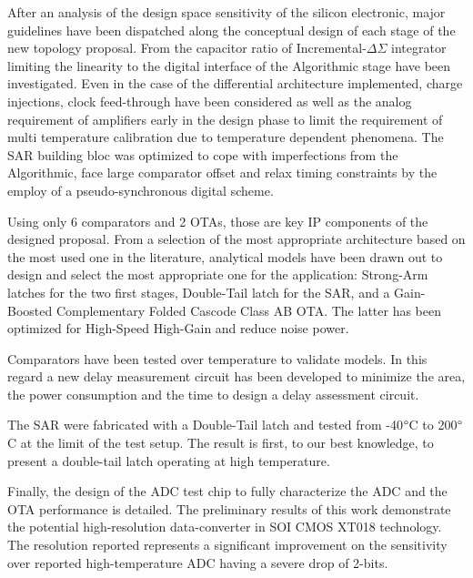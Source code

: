 After an analysis of the design space sensitivity of the silicon electronic, major guidelines have been dispatched along the conceptual design of each stage of the new topology proposal. From the capacitor ratio of Incremental-\(\Delta \Sigma\) integrator limiting the linearity to the digital interface of the Algorithmic stage have been investigated. Even in the case of the differential architecture implemented, charge injections, clock feed-through have been considered as well as the analog requirement of amplifiers early in the design phase to limit the requirement of multi temperature calibration due to temperature dependent phenomena. The SAR building bloc was optimized to cope with imperfections from the Algorithmic, face large comparator offset and relax timing constraints by the employ of a pseudo-synchronous digital scheme.

Using only 6 comparators and 2 OTAs, those are key IP components of the designed proposal. From a selection of the most appropriate architecture based on the most used one in the literature, analytical models have been drawn out to design and select the most appropriate one for the application: Strong-Arm latches for the two first stages, Double-Tail latch for the SAR, and a Gain-Boosted Complementary Folded Cascode Class AB OTA\@. The latter has been optimized for High-Speed High-Gain and reduce noise power.

Comparators have been tested over temperature to validate models. In this regard a new delay measurement circuit has been developed to minimize the area, the power consumption and the time to design a delay assessment circuit.

The SAR were fabricated with a Double-Tail latch and tested from -40$\degree$C to 200$\degree$C at the limit of the test setup. The result is first, to our best knowledge, to present a double-tail latch operating at high temperature.

Finally, the design of the ADC test chip to fully characterize the ADC and the OTA performance is detailed. The preliminary results of this work demonstrate the potential high-resolution data-converter in SOI CMOS XT018 technology. The resolution reported represents a significant improvement on the sensitivity over reported high-temperature ADC having a severe drop of 2-bits.

